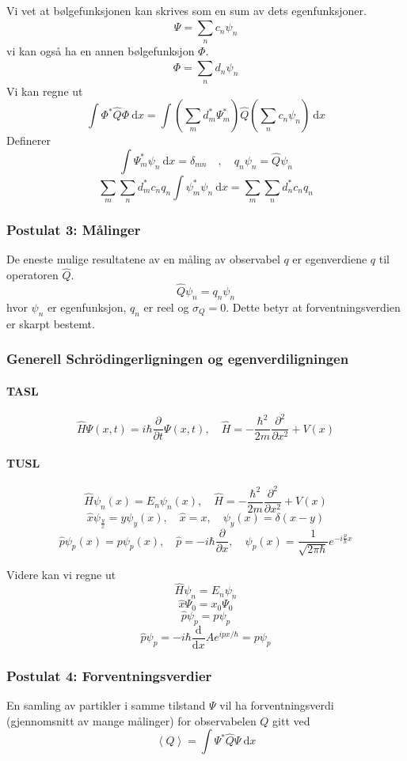 Vi vet at bølgefunksjonen kan skrives som en sum av dets egenfunksjoner. 
\[
Ψ = ∑_{n}^{} c_n ψ_n
\]
vi kan også ha en annen bølgefunksjon $Φ$.
\[
Φ = ∑_{n}^{} d_n ψ_n
\]
Vi kan regne ut
\[
∫ Φ^{*}\hat{Q}Φ \ \mathrm{d}x = ∫ \left(∑_{m}^{} d_m^{*} Ψ_m^{*}\right)\hat{Q}\left(∑_{n}^{} c_n ψ_n\right) \ \mathrm{d}x 
\]
Definerer 
\[
∫ Ψ_m^{*} ψ_n \ \mathrm{d}x = \delta_{mn} \quad , \quad q_nψ_n = \hat{Q} ψ_n
\]
\[
∑_{m}^{} ∑_{n}^{} d_m^{*} c_n q_n \int \psi_m^{*}\psi_n \ \mathrm{d}x = ∑_{m}^{} ∑_{n}^{} d_n^{*} c_n q_n
\]

\subsubsection*{Postulat 3: Målinger}
De eneste mulige resultatene av en måling av observabel $q$ er egenverdiene $q$ til operatoren $\hat{Q}$. 
\[
\hat{Q}ψ_n = q_n ψ_n
\]
hvor $ψ_n$ er egenfunksjon, $q_n$ er reel og $σ_{Q} = 0$. Dette betyr at forventningsverdien er skarpt bestemt. 

\subsubsection*{Generell Schrödingerligningen og egenverdiligningen}
\paragraph*{TASL}
\[
\hat{H}Ψ(x,t) = iℏ \frac{∂ }{∂ t} Ψ(x,t), \quad \hat{H} = -\frac{ℏ^{2}}{2m} \frac{∂^{2}}{∂x^{2}} + V(x)
\]
\paragraph*{TUSL}
\[
\hat{H}ψ_n(x) = E_n ψ_n(x) , \quad \hat{H} = -\frac{ℏ^{2}}{2m} \frac{∂^{2}}{∂x^{2}} + V(x)
\]
\[
\hat{x}ψ_\frac{y}{x} = yψ_y(x), \quad \hat{x} = x, \quad ψ_y(x) = δ(x-y)
\]
\[
\hat{p}ψ_p(x) = pψ_p(x), \quad \hat{p}= -iℏ \frac{∂}{∂x}, \quad ψ_p(x) = \frac{1}{\sqrt{2\pi \hbar}} e^{-i\frac{p}{\hbar}x}
\]

Videre kan vi regne ut 
\[
\hat{H}ψ_n = E_n ψ_n
\]
\[
\hat{x}Ψ_0 = x_0Ψ_0
\]
\[
\hat{p}ψ_p = p ψ_p
\]
\[
\hat{p}ψ_p = -iℏ \frac{\mathrm{d}}{\mathrm{d}x} Ae ^{ipx / ℏ} = pψ_p
\]
\subsubsection*{Postulat 4: Forventningsverdier}
En samling av partikler i samme tilstand $Ψ$ vil ha forventningsverdi (gjennomsnitt av mange målinger) for observabelen $Q$ gitt ved 
\[
\left<Q\right> = ∫ Ψ^{*}\hat{Q}Ψ \ \mathrm{d}x
\]

